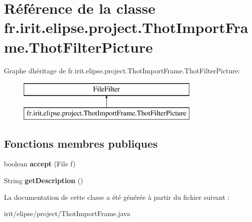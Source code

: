 \hypertarget{classfr_1_1irit_1_1elipse_1_1project_1_1_thot_import_frame_1_1_thot_filter_picture}{}\section{Référence de la classe fr.\+irit.\+elipse.\+project.\+Thot\+Import\+Frame.\+Thot\+Filter\+Picture}
\label{classfr_1_1irit_1_1elipse_1_1project_1_1_thot_import_frame_1_1_thot_filter_picture}
Graphe d\textquotesingle{}héritage de fr.\+irit.\+elipse.\+project.\+Thot\+Import\+Frame.\+Thot\+Filter\+Picture\+:\begin{figure}[H]
\begin{center}
\leavevmode
\includegraphics[height=2.000000cm]{classfr_1_1irit_1_1elipse_1_1project_1_1_thot_import_frame_1_1_thot_filter_picture}
\end{center}
\end{figure}
\subsection*{Fonctions membres publiques}
\begin{DoxyCompactItemize}
\item 
\mbox{\label{classfr_1_1irit_1_1elipse_1_1project_1_1_thot_import_frame_1_1_thot_filter_picture_a3fde7c6a7344003b7fde7aa042f3c513}} 
boolean {\bfseries accept} (File f)
\item 
\mbox{\label{classfr_1_1irit_1_1elipse_1_1project_1_1_thot_import_frame_1_1_thot_filter_picture_af34415a633534b476911247aa3546336}} 
String {\bfseries get\+Description} ()
\end{DoxyCompactItemize}


La documentation de cette classe a été générée à partir du fichier suivant \+:\begin{DoxyCompactItemize}
\item 
irit/elipse/project/Thot\+Import\+Frame.\+java\end{DoxyCompactItemize}
